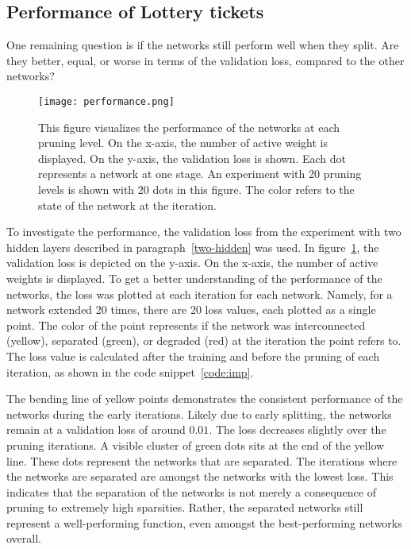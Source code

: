 \subsection{Performance of Lottery tickets}
One remaining question is if the networks still perform well when they split.
Are they better, equal, or worse in terms of the validation loss, compared to the other networks?

\begin{figure}[ht]
    \centering
    \texttt{[image: performance.png]}
    \caption{
        This figure visualizes the performance of the networks at each pruning level.
        On the x-axis, the number of active weight is displayed.
        On the y-axis, the validation loss is shown.
        Each dot represents a network at one stage.
        An experiment with 20 pruning levels is shown with 20 dots in this figure.
        The color refers to the state of the network at the iteration.
    }\label{fig:performance}
\end{figure}

To investigate the performance, the validation loss from the experiment with two hidden layers described in paragraph~\ref{two-hidden} was used.
In figure~\ref{fig:performance}, the validation loss is depicted on the y-axis.
On the x-axis, the number of active weights is displayed.
To get a better understanding of the performance of the networks, the loss was plotted at each iteration for each network.
Namely, for a network extended 20 times, there are 20 loss values, each plotted as a single point.
The color of the point represents if the network was interconnected (yellow), separated (green), or degraded (red) at the iteration the point refers to.
The loss value is calculated after the training and before the pruning of each iteration, as shown in the code snippet~\ref{code:imp}.

The bending line of yellow points demonstrates the consistent performance of the networks during the early iterations.
Likely due to early splitting, the networks remain at a validation loss of around $0.01$.
The loss decreases slightly over the pruning iterations.
A visible cluster of green dots sits at the end of the yellow line.
These dots represent the networks that are separated.
The iterations where the networks are separated are amongst the networks with the lowest loss.
This indicates that the separation of the networks is not merely a consequence of pruning to extremely high sparsities.
Rather, the separated networks still represent a well-performing function, even amongst the best-performing networks overall.

